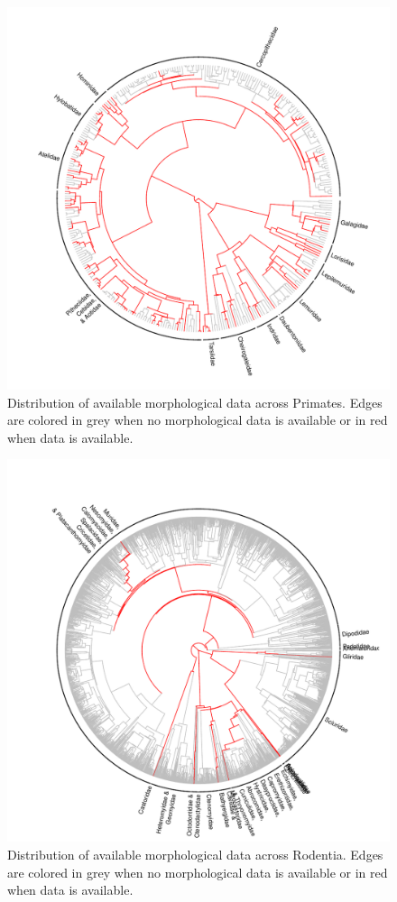 \begin{figure}[!htbp]
\centering
    \includegraphics[width=1\textwidth]{Supplementary/Supp_figure_PRIMATES.pdf}
\caption{Distribution of available morphological data across Primates. Edges are colored in grey when no morphological data is available or in red when data is available.}
\label{Supp_Figure_Phylo-Primates}
\end{figure}

\begin{figure}[!htbp]
\centering
    \includegraphics[width=1\textwidth]{Supplementary/Supp_figure_RODENTIA.pdf}
\caption{Distribution of available morphological data across Rodentia. Edges are colored in grey when no morphological data is available or in red when data is available.}
\label{Supp_Figure_Phylo-Rodentia}
\end{figure}

